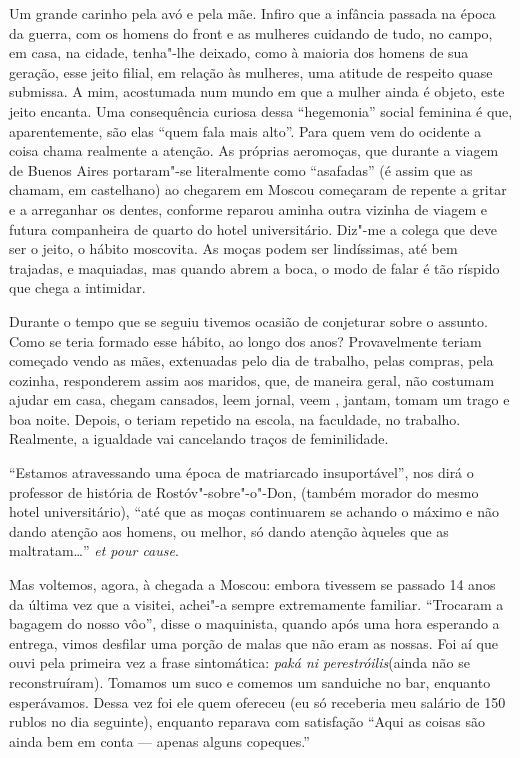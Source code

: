 Um grande carinho pela avó e pela mãe. Infiro que a infância passada na
época da guerra, com os homens do front e as mulheres cuidando de tudo,
no campo, em casa, na cidade, tenha"-lhe deixado, como à maioria dos
homens de sua geração, esse jeito filial, em relação às mulheres, uma
atitude de respeito quase submissa. A mim, acostumada num mundo em que a
mulher ainda é objeto, este jeito encanta. Uma consequência curiosa
dessa ``hegemonia'' social feminina é que, aparentemente, são elas
``quem fala mais alto''. Para quem vem do ocidente a coisa chama
realmente a atenção. As próprias aeromoças, que durante a viagem de
Buenos Aires portaram"-se literalmente como ``asafadas'' (é assim que as
chamam, em castelhano) ao chegarem em Moscou começaram de repente a
gritar e a arreganhar os dentes, conforme reparou aminha outra vizinha
de viagem e futura companheira de quarto do hotel universitário. Diz"-me
a colega que deve ser o jeito, o hábito moscovita. As moças podem ser
lindíssimas, até bem trajadas, e maquiadas, mas quando abrem a boca, o
modo de falar é tão ríspido que chega a intimidar.

Durante o tempo que se seguiu tivemos ocasião de conjeturar sobre o
assunto. Como se teria formado esse hábito, ao longo dos anos?
Provavelmente teriam começado vendo as mães, extenuadas pelo dia de
trabalho, pelas compras, pela cozinha, responderem assim aos maridos,
que, de maneira geral, não costumam ajudar em casa, chegam cansados, leem
jornal, veem , jantam, tomam um trago e boa noite. Depois, o teriam
repetido na escola, na faculdade, no trabalho. Realmente, a igualdade
vai cancelando traços de feminilidade.

``Estamos atravessando uma época de matriarcado insuportável'', nos dirá
o professor de história de Rostóv"-sobre"-o"-Don, (também morador do mesmo
hotel universitário), ``até que as moças continuarem se achando o máximo
e não dando atenção aos homens, ou melhor, só dando atenção àqueles que
as maltratam\ldots{}'' \emph{et pour cause}.

Mas voltemos, agora, à chegada a Moscou: embora tivessem se passado 14
anos da última vez que a visitei, achei"-a sempre extremamente familiar.
``Trocaram a bagagem do nosso vôo'', disse o maquinista, quando após uma
hora esperando a entrega, vimos desfilar uma porção de malas que não
eram as nossas. Foi aí que ouvi pela primeira vez a frase sintomática:
\emph{paká ni perestróilis}(ainda não se reconstruíram). Tomamos um suco
e comemos um sanduiche no bar, enquanto esperávamos. Dessa vez foi ele
quem ofereceu (eu só receberia meu salário de 150 rublos no dia
seguinte), enquanto reparava com satisfação ``Aqui as coisas são ainda
bem em conta --- apenas alguns copeques.''

